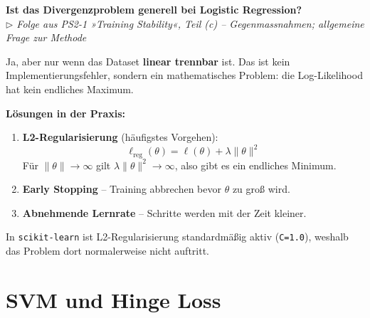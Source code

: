 \documentclass[11pt, a4paper]{article}
\newenvironment{frage}[2]{%
  \begin{tcolorbox}[frageboxstyle, title={Frage}]
  \textbf{#1}\\[3pt]
  {\small\itshape\color{black!55}\(\triangleright\) #2}
  \end{tcolorbox}
  \begin{tcolorbox}[antwortboxstyle]
}{%
  \end{tcolorbox}
  \vspace{4mm}
}
\begin{document}
\begin{frage}{Ist das Divergenzproblem generell bei Logistic Regression?}{Folge aus PS2-1 »Training Stability«, Teil (c) -- Gegenmassnahmen; allgemeine Frage zur Methode}

Ja, aber nur wenn das Dataset \textbf{linear trennbar} ist. Das ist kein Implementierungsfehler,
sondern ein mathematisches Problem: die Log-Likelihood hat kein endliches Maximum.

\textbf{Lösungen in der Praxis:}

\begin{enumerate}[leftmargin=*, label=(\arabic*)]
  \item \textbf{L2-Regularisierung} (häufigstes Vorgehen):
    \[
      \ell_{\text{reg}}(\theta)
      = \ell(\theta) + \lambda\|\theta\|^2
    \]
    Für $\|\theta\| \to \infty$ gilt $\lambda\|\theta\|^2 \to \infty$, also gibt es ein endliches
    Minimum.

  \item \textbf{Early Stopping} -- Training abbrechen bevor $\theta$ zu groß wird.

  \item \textbf{Abnehmende Lernrate} -- Schritte werden mit der Zeit kleiner.
\end{enumerate}

In \texttt{scikit-learn} ist L2-Regularisierung standardmäßig aktiv (\texttt{C=1.0}), weshalb das
Problem dort normalerweise nicht auftritt.

\end{frage}

\section{SVM und Hinge Loss}
\end{document}
